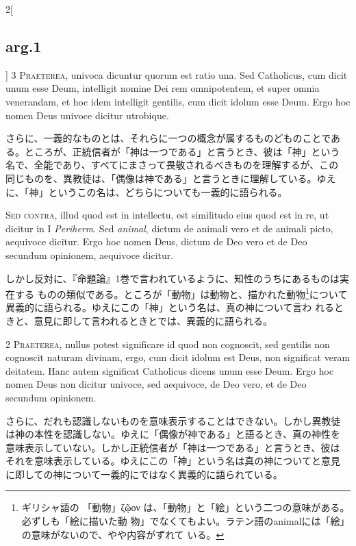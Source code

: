 \documentclass[paper=a4paper,fontsize=10pt,jafontsize=9pt,titlepage]{jlreq}
\begin{document}
\begin{paracol}{2}[\subsection{arg.1}]
{\scshape 3 Praeterea}, univoca dicuntur quorum est ratio una. Sed
Catholicus, cum dicit unum esse Deum, intelligit nomine Dei rem
omnipotentem, et super omnia venerandam, et hoc idem intelligit
gentilis, cum dicit idolum esse Deum. Ergo hoc nomen Deus univoce
dicitur utrobique.

\switchcolumn

さらに、一義的なものとは、それらに一つの概念が属するものどものことであ
る。ところが、正統信者が「神は一つである」と言うとき、彼は「神」という
名で、全能であり、すべてにまさって畏敬されるべきものを理解するが、この
同じものを、異教徒は、「偶像は神である」と言うときに理解している。ゆえ
に、「神」というこの名は、どちらについても一義的に語られる。

\switchcolumn*[\subsection{s.c.}]

{\scshape Sed contra}, illud quod est in intellectu, est similitudo
eius quod est in re, ut dicitur in I {\itshape Periherm}. Sed
{\itshape animal}, dictum de animali vero et de animali picto,
aequivoce dicitur. Ergo hoc nomen Deus, dictum de Deo vero et de Deo
secundum opinionem, aequivoce dicitur.

\switchcolumn

しかし反対に、『命題論』1巻で言われているように、知性のうちにあるものは実在する
ものの類似である。ところが「動物」は動物と、描かれた動物\footnote{ギリシャ語の
「動物」ζῷον は、「動物」と「絵」という二つの意味がある。必ずしも「絵に描いた動
物」でなくてもよい。ラテン語のanimalには「絵」の意味がないので、やや内容がずれて
いる。}について異義的に語られる。ゆえにこの「神」という名は、真の神について言わ
れるときと、意見に即して言われるときとでは、異義的に語られる。


{\scshape 2 Praeterea}, nullus potest significare id quod non
cognoscit, sed gentilis non cognoscit naturam divinam, ergo, cum dicit
idolum est Deus, non significat veram deitatem. Hanc autem significat
Catholicus dicens unum esse Deum. Ergo hoc nomen Deus non dicitur
univoce, sed aequivoce, de Deo vero, et de Deo secundum opinionem.

\switchcolumn

さらに、だれも認識しないものを意味表示することはできない。しかし異教徒
は神の本性を認識しない。ゆえに「偶像が神である」と語るとき、真の神性を
意味表示していない。しかし正統信者が「神は一つである」と言うとき、彼は
それを意味表示している。ゆえにこの「神」という名は真の神についてと意見
に即しての神について一義的にではなく異義的に語られている。


\end{paracol}
\end{document}
